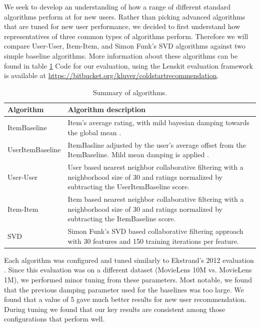 \documentclass[letterpaper]{sig-alternate}
\begin{document}
  We seek to develop an understanding of how a range of different standard algorithms perform at for new users.
  Rather than picking advanced algorithms that are tuned for new user performance, we decided to first understand how representatives of three common types of algorithms perform.
  Therefore we will compare User-User\cite{resnick1994grouplens}, Item-Item\cite{sarwar2001item}, and Simon Funk's SVD\cite{funk_netflix_2006} algorithms against two simple baseline algorithms.
  More information about these algorithms can be found in table \ref{tbl:algo}
  Code for our evaluation, using the Lenskit evaluation framework \cite{lenskit} is available at \url{https://bitbucket.org/kluver/coldstartrecommendation}.
  
  \begin{table}
    \centering
    \begin{tabular}{|p{6em}|p{18em}|}
      \hline
      Algorithm          & Algorithm description \\\hline
      ItemBaseline       & Item's average rating, with mild bayesian damping towards the global mean \cite{funk_netflix_2006}. \\\hline
      UserItem\-Baseline & ItemBasline adjusted by the user's average offset from the ItemBaseline. Mild mean damping is applied \cite{funk_netflix_2006}. \\\hline
      User-User          & User based nearest neighbor collaborative filtering \cite{resnick1994grouplens} with a neighborhood size of 30 and ratings normalized by subtracting the UserItemBaseline score. \\\hline
      Item-Item          & Item based nearest neighbor collaborative filtering \cite{sarwar2001item} with a neighborhood size of 30 and ratings normalized by subtracting the ItemBaseline score.   \\\hline
      SVD                & Simon Funk's SVD based collaborative filtering approach \cite{funk_netflix_2006} with 30 features and 150 training iterations per feature. \\\hline
    \end{tabular}
    \caption{Summary of algorithms.}
    \label{tbl:algo}
  \end{table}
  
  Each algorithm was configured and tuned similarly to Ekstrand's 2012 evaluation \cite{ekstrand2012recommenders}.
  Since this evaluation was on a different dataset (MovieLens 10M vs. MovieLens 1M), we performed minor tuning from these parameters.
  Most notable, we found that the previous damping parameter used for the baselines was too large.
  We found that a value of 5 gave much better results for new user recommendation.
  During tuning we found that our key results are consistent among those configurations that perform well.
\end{document}

